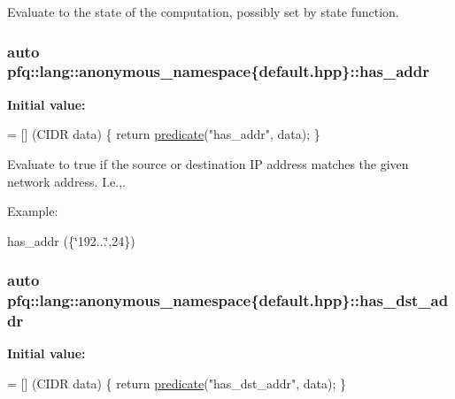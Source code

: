 Evaluate to the state of the computation, possibly set by {\ttfamily state} function. 

\subsubsection[{\texorpdfstring{has\+\_\+addr}{has_addr}}]{\setlength{\rightskip}{0pt plus 5cm}auto pfq\+::lang\+::anonymous\+\_\+namespace\{default.\+hpp\}\+::has\+\_\+addr}\hypertarget{namespacepfq_1_1lang_1_1anonymous__namespace_02default_8hpp_03_a74c6b7e812fb3d312ebf534960a6a91d}{}\label{namespacepfq_1_1lang_1_1anonymous__namespace_02default_8hpp_03_a74c6b7e812fb3d312ebf534960a6a91d}
{\bfseries Initial value\+:}
\begin{DoxyCode}
= [] (CIDR data)
        \{
            \textcolor{keywordflow}{return} \hyperlink{namespacepfq_1_1lang_aca9adafc436b7f851621b979fa1aaf88}{predicate}(\textcolor{stringliteral}{"has\_addr"}, data);
        \}
\end{DoxyCode}


Evaluate to {\ttfamily true} if the source or destination IP address matches the given network address. I.\+e.,. 

Example\+:

has\+\_\+addr (\{\char`\"{}192...\char`\"{},24\}) 
\subsubsection[{\texorpdfstring{has\+\_\+dst\+\_\+addr}{has_dst_addr}}]{\setlength{\rightskip}{0pt plus 5cm}auto pfq\+::lang\+::anonymous\+\_\+namespace\{default.\+hpp\}\+::has\+\_\+dst\+\_\+addr}\hypertarget{namespacepfq_1_1lang_1_1anonymous__namespace_02default_8hpp_03_a0a53822af0ed8ea341f16a1da5ea83e3}{}\label{namespacepfq_1_1lang_1_1anonymous__namespace_02default_8hpp_03_a0a53822af0ed8ea341f16a1da5ea83e3}
{\bfseries Initial value\+:}
\begin{DoxyCode}
= [] (CIDR data)
        \{
            \textcolor{keywordflow}{return} \hyperlink{namespacepfq_1_1lang_aca9adafc436b7f851621b979fa1aaf88}{predicate}(\textcolor{stringliteral}{"has\_dst\_addr"}, data);
        \}
\end{DoxyCode}


